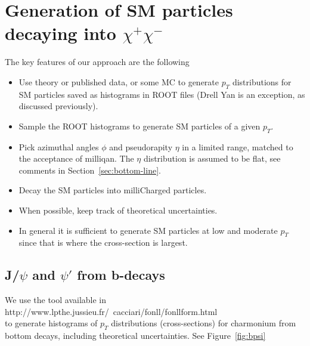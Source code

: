 \documentclass[12pt]{article}
\begin{document}
  \section{Generation of SM particles decaying into $\chi^+ \chi^-$}


  The key features of our approach are the following
\begin{itemize}
\item Use theory or published data, or some MC to generate $p_T$ distributions for SM
  particles
saved as histograms in ROOT files (Drell Yan is an exception, as discussed previously).
\item Sample the ROOT histograms to generate SM particles of a 
given $p_T$.
\item Pick azimuthal angles $\phi$ and pseudorapity $\eta$ in a
  limited 
  range, matched to the acceptance of milliqan.  The $\eta$
  distribution is assumed to be flat, see comments in
  Section~\ref{sec:bottom-line}.
\item Decay the SM particles into milliCharged particles. 
\item When possible, keep track of theoretical uncertainties.
\item In general it is sufficient to generate SM particles at low 
and moderate $p_T$ since that is where the cross-section is largest.
\end{itemize}

\subsection{J/$\psi$ and $\psi'$ from b-decays}
\label{sec:bpsi}
We use the tool available in \\
http://www.lpthe.jussieu.fr/~cacciari/fonll/fonllform.html \\
to
generate histograms of $p_T$ distributions (cross-sections) for charmonium from 
bottom decays, including theoretical 
uncertainties\cite{Cacciari:2012ny,Cacciari:2015fta}.  
See Figure~\ref{fig:bpsi} 
\end{document}

